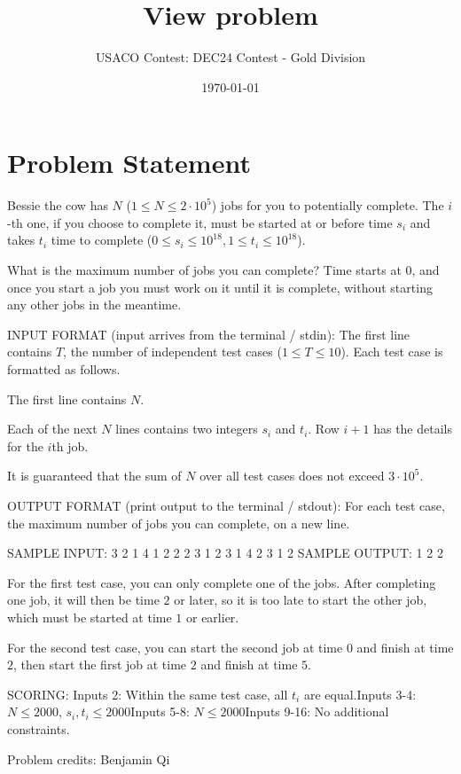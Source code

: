 \documentclass[12pt]{article}
\title{View problem}
\author{USACO Contest: DEC24 Contest - Gold Division}
\date{\today}
\begin{document}
\maketitle

\section*{Problem Statement}


Bessie the cow has $N$ ($1\le N\le 2\cdot 10^5$) jobs for you to potentially
complete. The $i$-th one, if you choose to complete it, must be started at or
before time $s_i$  and takes $t_i$ time to complete
($0\le s_i\le 10^{18}, 1\le t_i\le 10^{18}$).

What is the maximum number of jobs you can complete? Time starts at $0$, and
once you start a job you must work on it until it is complete, without starting
any other jobs in the meantime.

INPUT FORMAT (input arrives from the terminal / stdin):
The first line contains $T$, the number of independent test cases
($1\le T\le 10$). Each test case is formatted as follows.

The first line contains $N$.

Each of the next $N$ lines contains two integers $s_i$ and $t_i$. Row $i+1$ has
the details for the $i$th job.

It is guaranteed that the sum of $N$ over all test cases does not exceed
$3\cdot 10^5$.

OUTPUT FORMAT (print output to the terminal / stdout):
For each test case, the maximum number of jobs you can complete, on a new line.

SAMPLE INPUT:
3
2
1 4
1 2
2
2 3
1 2
3
1 4
2 3
1 2
SAMPLE OUTPUT: 
1
2
2

For the first test case, you can only complete one of the jobs. After completing
one job, it will then be time $2$ or later, so it is too late to start the other
job, which must be started at time $1$ or earlier.

For the second test case,  you can start the second job at time $0$ and finish
at time $2$,  then start the first job at time $2$ and finish at time $5$.

SCORING:
Inputs 2: Within the same test case, all $t_i$ are equal.Inputs 3-4: $N\le 2000$, $s_i, t_i\le 2000$Inputs 5-8: $N\le 2000$Inputs 9-16: No additional constraints.


Problem credits: Benjamin Qi
\end{document}
